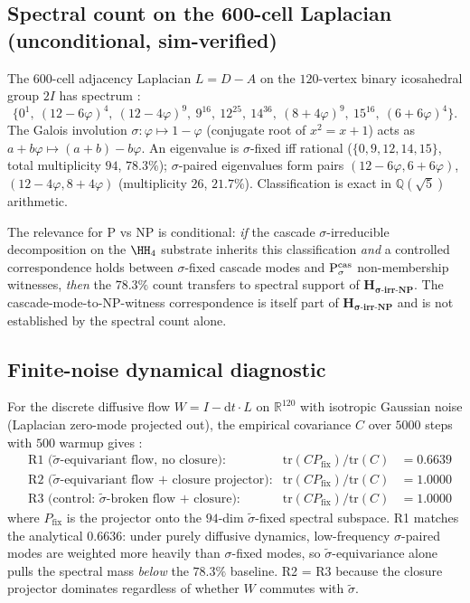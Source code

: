 \documentclass[11pt, a4paper]{amsart}
\theoremstyle{definition}
\newcommand{\R}{\mathbb{R}}
\newcommand{\Q}{\mathbb{Q}}
\begin{document}
\subsection{Spectral count on the 600-cell Laplacian (unconditional, sim-verified)}

The 600-cell adjacency Laplacian $L = D - A$ on the
$120$-vertex binary icosahedral group $2I$ has spectrum
\cite{CascadeAttractorSpectrum}:
\[
  \{0^{1},\ (12{-}6\varphi)^{4},\ (12{-}4\varphi)^{9},\ 9^{16},\
   12^{25},\ 14^{36},\ (8{+}4\varphi)^{9},\ 15^{16},\
   (6{+}6\varphi)^{4}\}.
\]
The Galois involution $\sigma: \varphi \mapsto 1-\varphi$
(conjugate root of $x^2 = x + 1$) acts as
$a + b\varphi \mapsto (a+b) - b\varphi$.  An eigenvalue is
$\sigma$-fixed iff rational ($\{0,9,12,14,15\}$, total multiplicity
$94$, $\bm{78.3\%}$); $\sigma$-paired eigenvalues form pairs
$(12{-}6\varphi, 6{+}6\varphi)$, $(12{-}4\varphi, 8{+}4\varphi)$
(multiplicity $26$, $\bm{21.7\%}$).  Classification is exact in
$\Q(\sqrt 5)$ arithmetic.

The relevance for P vs NP is conditional: \emph{if} the cascade
$\sigma$-irreducible decomposition on the $\HH_4$ substrate
inherits this classification \emph{and} a controlled correspondence
holds between $\sigma$-fixed cascade modes and
$\mathrm{P}_\sigma^{\rm cas}$ non-membership witnesses, \emph{then}
the $78.3\%$ count transfers to spectral support of
$\mathbf{H_{\sigma\text{-irr-NP}}}$.  The cascade-mode-to-NP-witness
correspondence is itself part of $\mathbf{H_{\sigma\text{-irr-NP}}}$
and is not established by the spectral count alone.

\subsection{Finite-noise dynamical diagnostic}

For the discrete diffusive flow $W = I - \mathrm{d}t \cdot L$ on
$\R^{120}$ with isotropic Gaussian noise (Laplacian zero-mode
projected out), the empirical covariance $C$ over $5000$ steps
with $500$ warmup gives \cite{CascadeAttractorDynamics}:
\begin{align*}
&\text{R1 ($\widetilde\sigma$-equivariant flow, no closure):}
  &\mathrm{tr}(C P_{\mathrm{fix}})/\mathrm{tr}(C) &= 0.6639 \\
&\text{R2 ($\widetilde\sigma$-equivariant flow + closure projector):}
  &\mathrm{tr}(C P_{\mathrm{fix}})/\mathrm{tr}(C) &= 1.0000 \\
&\text{R3 (control: $\widetilde\sigma$-broken flow + closure):}
  &\mathrm{tr}(C P_{\mathrm{fix}})/\mathrm{tr}(C) &= 1.0000
\end{align*}
where $P_{\mathrm{fix}}$ is the projector onto the $94$-dim
$\widetilde\sigma$-fixed spectral subspace.  R1 matches the
analytical $0.6636$: under purely diffusive dynamics, low-frequency
$\sigma$-paired modes are weighted more heavily than $\sigma$-fixed
modes, so $\widetilde\sigma$-equivariance alone pulls the spectral
mass \emph{below} the $78.3\%$ baseline.  R2 = R3 because the
closure projector dominates regardless of whether $W$ commutes
with $\widetilde\sigma$.
\end{document}
